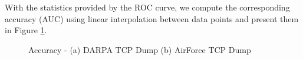 With the statistics provided by the ROC curve, we compute the corresponding accuracy (AUC) using linear interpolation between data points and present them in Figure \ref{fig:t4.3_auc}.

\begin{figure}[!ht]
    \centering
    \caption{Accuracy - (a) DARPA TCP Dump (b) AirForce TCP Dump}
    \label{fig:t4.3_auc}
\end{figure}


